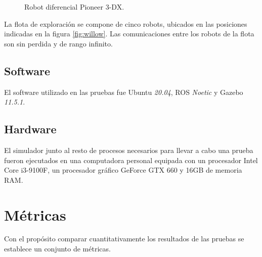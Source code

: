\begin{figure}[H]
  \centerfloat

  \qquad

  \caption[Robot diferencial Pioneer 3-DX.]{Robot diferencial Pioneer 3-DX.}\label{fig:p3dx}

\end{figure}

La flota de exploración se compone de cinco robots, ubicados en las posiciones
indicadas en la figura \ref{fig:willow}. Las comunicaciones entre los robots de
la flota son sin perdida y de rango infinito.

\subsection{Software}
El software utilizado en las pruebas fue Ubuntu \emph{20.04}, \gls{ROS} \emph{Noetic} y Gazebo
\emph{11.5.1}. 

\subsection{Hardware}
El simulador junto al resto de procesos necesarios para llevar a cabo una
prueba fueron ejecutados en una computadora personal equipada con un procesador
Intel Core i3-9100F, un procesador gráfico GeForce GTX 660 y 16GB de memoria
RAM.

\section{Métricas}
Con el propósito comparar cuantitativamente los resultados de las pruebas se
establece un conjunto de métricas. 

